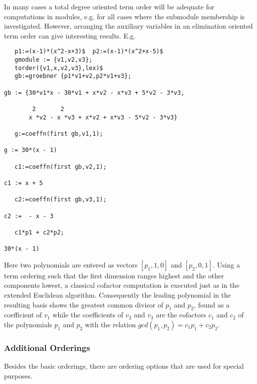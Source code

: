 In many cases a total degree oriented term order will be adequate
for computations in modules, e.g. for all cases where the
submodule membership is investigated. However, arranging
the auxiliary variables in an elimination oriented term order
can give interesting results. E.g.
\begin{verbatim}
   p1:=(x-1)*(x^2-x+3)$  p2:=(x-1)*(x^2+x-5)$
   gmodule := {v1,v2,v3};
   torder({v1,x,v2,v3},lex)$
   gb:=groebner {p1*v1+v2,p2*v1+v3};

gb := {30*v1*x - 30*v1 + x*v2 - x*v3 + 5*v2 - 3*v3,

        2       2
       x *v2 - x *v3 + x*v2 + x*v3 - 5*v2 - 3*v3}

   g:=coeffn(first gb,v1,1);

g := 30*(x - 1)

   c1:=coeffn(first gb,v2,1);

c1 := x + 5

   c2:=coeffn(first gb,v3,1);

c2 :=  - x - 3

   c1*p1 + c2*p2;

30*(x - 1)

\end{verbatim}
Here two polynomials
are entered as vectors $[p_1,1,0]$ and $[p_2,0,1]$. Using a term
ordering such that the first dimension ranges highest and the
other components lowest, a classical cofactor computation is
executed just as in the extended Euclidean algorithm.
Consequently the leading polynomial in the resulting
basis shows the greatest common divisor of $p_1$ and $p_2$,
found as a coefficient of $v_1$ while the coefficients
of $v_2$ and $v_3$ are the cofactors $c_1$ and $c_2$ of the polynomials
$p_1$ and $p_2$ with the relation $gcd(p_1,p_2) = c_1p_1 + c_2p_2$.

\subsubsection{Additional Orderings}
Besides the basic orderings, there are ordering options that are used for
special purposes.

